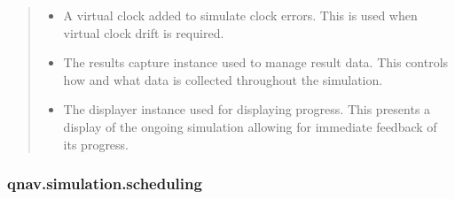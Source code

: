 \documentclass[letterpaper,10pt,english]{sphinxmanual}
\begin{document}
\begin{fulllineitems}
\begin{quote}
\begin{description}
\begin{itemize}
\item {} 
\sphinxAtStartPar
{} \textendash{} A virtual clock added to simulate clock errors.
This is used when virtual clock drift is required.

\item {} 
\sphinxAtStartPar
{} \textendash{} The results capture instance used to manage result data.
This controls how and what data is collected throughout the simulation.

\item {} 
\sphinxAtStartPar
{} \textendash{} The displayer instance used for displaying progress.
This presents a display of the ongoing simulation allowing for
immediate feedback of its progress.

\end{itemize}

\end{description}\end{quote}

\end{fulllineitems}


\sphinxstepscope


\subsubsection{qnav.simulation.scheduling}
\label{\detokenize{modules/simulation/scheduling:module-qnav.simulation.scheduling}}\label{\detokenize{modules/simulation/scheduling:qnav-simulation-scheduling}}\label{\detokenize{modules/simulation/scheduling::doc}}
\end{document}

